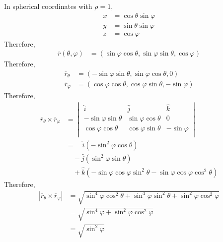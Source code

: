 \documentclass[fleqn, a4paper, 8pt, twoside]{amsart}
\theoremstyle{definition}
\theoremstyle{bluedefinition}
\theoremstyle{redtheorem}
\begin{document}
\begin{multicols}{2}
\begin{spacing}{0.7}
\begin{solution}
	In spherical coordinates with $\rho = 1$,
	\begin{align*}
		x &= \cos \theta \sin \varphi\\
		y &= \sin \theta \sin \varphi\\
		z &= \cos \varphi
	\end{align*}
	Therefore,
	\begin{align*}
		\overline{r}(\theta , \varphi) & = (\sin \varphi \cos \theta , \sin \varphi \sin \theta , \cos \varphi)
	\end{align*}
	Therefore,
	\begin{align*}
		\overline{r}_{\theta}  & = (-\sin \varphi \sin \theta , \sin \varphi \cos \theta , 0) \\
		\overline{r}_{\varphi} & = (\cos \varphi \cos \theta , \cos \varphi \sin \theta , -\sin \varphi)
	\end{align*}
	Therefore,
	\begin{align*}
		\overline{r}_{\theta} \times \overline{r}_{\varphi} &=
			\begin{vmatrix}
				\hat{i}                   & \hat{j}                  & \hat{k}       \\
				-\sin \varphi \sin \theta & \sin \varphi \cos \theta & 0             \\
				\cos \varphi \cos \theta  & \cos \varphi \sin \theta & -\sin \varphi \\
			\end{vmatrix}\\
		&= \quad \hat{i} \left( -\sin^2 \varphi \cos \theta \right)\\
		&\quad - \hat{j} \left( \sin^2 \varphi \sin \theta \right)\\
		&\quad + \hat{k} \left( -\sin \varphi \cos \varphi \sin^2 \theta - \sin \varphi \cos \varphi \cos^2 \theta \right)
	\end{align*}
	Therefore,
	\begin{align*}
		\left| \overline{r}_{\theta} \times \overline{r}_{\varphi} \right| & = \sqrt{\sin^4 \varphi \cos^2 \theta + \sin^4 \varphi \sin^2 \theta + \sin^2 \varphi \cos^2 \varphi} \\
                                                                                   & = \sqrt{\sin^4 \varphi + \sin^2 \varphi \cos^2 \varphi}                                              \\
                                                                                   & = \sqrt{\sin^2 \varphi}                                                                              \\

\end{align*}
\end{solution}
\end{spacing}
\end{multicols}
\end{document}
